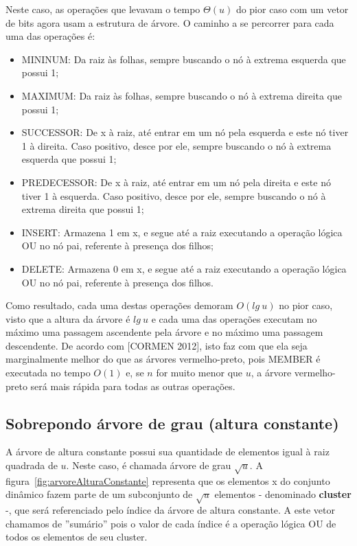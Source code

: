 \documentclass[12pt]{article}
\begin{document}
Neste caso, as operações que levavam o tempo $\Theta(u)$ do pior caso com um vetor de bits agora usam a estrutura de árvore. O caminho a se percorrer para cada uma das operações é:
\begin{itemize}
    \item MININUM: Da raiz às folhas, sempre buscando o nó à extrema esquerda que possui 1;
    \item MAXIMUM: Da raiz às folhas, sempre buscando o nó à extrema direita que possui 1;
    \item SUCCESSOR: De x à raiz, até entrar em um nó pela esquerda e este nó tiver 1 à direita. Caso positivo, desce por ele, sempre buscando o nó à extrema esquerda que possui 1;
    \item PREDECESSOR: De x à raiz, até entrar em um nó pela direita e este nó tiver 1 à esquerda. Caso positivo, desce por ele, sempre buscando o nó à extrema direita que possui 1;
    \item INSERT: Armazena 1 em x, e segue até a raiz executando a operação lógica OU no nó pai, referente à presença dos filhos;
    \item DELETE: Armazena 0 em x, e segue até a raiz executando a operação lógica OU no nó pai, referente à presença dos filhos.
\end{itemize}

Como resultado, cada uma destas operações demoram $O(lg\ u)$ no pior caso, visto que a altura da árvore é $lg\ u$ e cada uma das operações executam no máximo uma passagem ascendente pela árvore e no máximo uma passagem descendente. De acordo com [CORMEN 2012], isto faz com que ela seja marginalmente melhor do que as árvores vermelho-preto, pois MEMBER é executada no tempo $O(1)$ e, se $n$ for muito menor que $u$, a árvore vermelho-preto será mais rápida para todas as outras operações.

\subsection{Sobrepondo árvore de grau (altura constante)}

A árvore de altura constante possui sua quantidade de elementos igual à raiz quadrada de $u$. Neste caso, é chamada árvore de grau $\sqrt{u}$. A figura~\ref{fig:arvoreAlturaConstante} representa que os elementos x do conjunto dinâmico fazem parte de um subconjunto de $\sqrt{u}$ elementos - denominado \textbf{cluster} -, que será referenciado pelo índice da árvore de altura constante. A este vetor chamamos de ''sumário'' pois o valor de cada índice é a operação lógica OU de todos os elementos de seu cluster.
\end{document}

